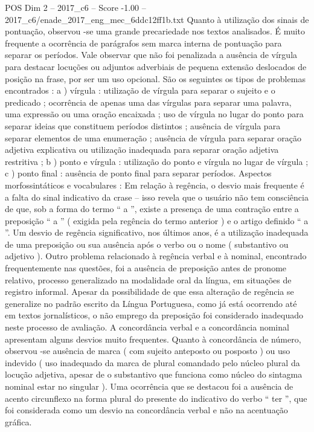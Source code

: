 \begin{textsample}{POS Dim 2 – 2017\_c6 – Score -1.00 – 2017\_c6/enade\_2017\_eng\_mec\_6ddc12ff1b.txt}
Quanto à utilização dos sinais de pontuação, observou -se uma grande precariedade nos textos analisados.
É muito frequente a ocorrência de parágrafos sem marca interna de pontuação para separar os períodos.
Vale observar que não foi penalizada a ausência de vírgula para destacar locuções ou adjuntos adverbiais de pequena extensão deslocados de posição na frase, por ser um uso opcional.
São os seguintes os tipos de problemas encontrados : a ) vírgula : utilização de vírgula para separar o sujeito e o predicado ; ocorrência de apenas uma das vírgulas para separar uma palavra, uma expressão ou uma oração encaixada ; uso de vírgula no lugar do ponto para separar ideias que constituem períodos distintos ; ausência de vírgula para separar elementos de uma enumeração ; ausência de vírgula para separar oração adjetiva explicativa ou utilização inadequada para separar oração adjetiva restritiva ; b ) ponto e vírgula : utilização do ponto e vírgula no lugar de vírgula ; c ) ponto final : ausência de ponto final para separar períodos.
Aspectos morfossintáticos e vocabulares : Em relação à regência, o desvio mais frequente é a falta do sinal indicativo da crase – isso revela que o usuário não tem consciência de que, sob a forma do termo “ a ”, existe a presença de uma contração entre a preposição “ a ” ( exigida pela regência do termo anterior ) e o artigo definido “ a ”.
Um desvio de regência significativo, nos últimos anos, é a utilização inadequada de uma preposição ou sua ausência após o verbo ou o nome ( substantivo ou adjetivo ).
Outro problema relacionado à regência verbal e à nominal, encontrado frequentemente nas questões, foi a ausência de preposição antes de pronome relativo, processo generalizado na modalidade oral da língua, em situações de registro informal.
Apesar da possibilidade de que essa alteração de regência se generalize no padrão escrito da Língua Portuguesa, como já está ocorrendo até em textos jornalísticos, o não emprego da preposição foi considerado inadequado neste processo de avaliação.
A concordância verbal e a concordância nominal apresentam alguns desvios muito frequentes.
Quanto à concordância de número, observou -se ausência de marca ( com sujeito anteposto ou posposto ) ou uso indevido ( uso inadequado da marca de plural comandado pelo núcleo plural da locução adjetiva, apesar de o substantivo que funciona como núcleo do sintagma nominal estar no singular ).
Uma ocorrência que se destacou foi a ausência de acento circunflexo na forma plural do presente do indicativo do verbo “ ter ”, que foi considerada como um desvio na concordância verbal e não na acentuação gráfica.

\end{textsample}
